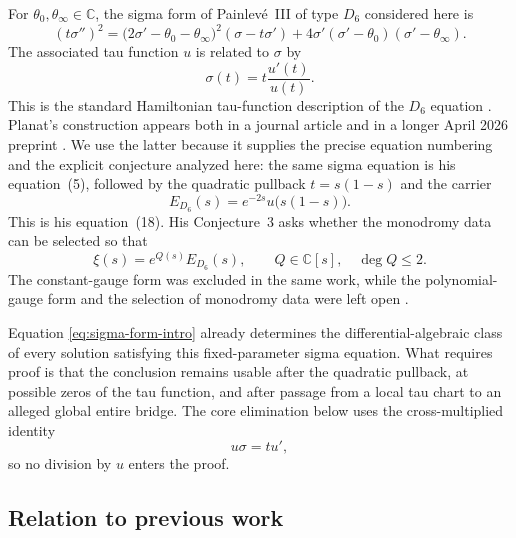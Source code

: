 \documentclass[11pt]{article}
\numberwithin{equation}{section}
\theoremstyle{definition}
\theoremstyle{remark}
\newcommand{\C}{\mathbb C}
\begin{document}
For $\theta_0,\theta_\infty\in\C$, the sigma form of Painlev\'e~III of type $D_6$ considered
here is
\begin{equation}
 (t\sigma'')^2
 =\bigl(2\sigma'-\theta_0-\theta_\infty\bigr)^2
      (\sigma-t\sigma')
   +4\sigma'(\sigma'-\theta_0)(\sigma'-\theta_\infty).
 \label{eq:sigma-form-intro}
\end{equation}
The associated tau function $u$ is related to $\sigma$ by
\begin{equation}
 \sigma(t)=t\frac{u'(t)}{u(t)}.
 \label{eq:tau-sigma-quotient}
\end{equation}
This is the standard Hamiltonian tau-function description of the $D_6$ equation
\cite{JMU1981,Miwa1981,Okamoto1981,Okamoto1987}.  Planat's construction appears both in a journal
article \cite{Planat2026GFJ} and in a longer April 2026 preprint \cite{Planat2026}.  We use the
latter because it supplies the precise equation numbering and the explicit conjecture analyzed
here: the same sigma equation is his equation~(5), followed by the quadratic pullback
$t=s(1-s)$ and the carrier
\begin{equation}
 E_{D_6}(s)=e^{-2s}u\bigl(s(1-s)\bigr).
 \label{eq:planat-carrier}
\end{equation}
This is his equation~(18).  His Conjecture~3 asks whether the monodromy data can be selected so
that
\begin{equation}
 \xi(s)=e^{Q(s)}E_{D_6}(s),
 \qquad Q\in\C[s],\quad \deg Q\leq2.
 \label{eq:planat-bridge}
\end{equation}
The constant-gauge form was excluded in the same work, while the polynomial-gauge form and the
selection of monodromy data were left open \cite[Conjecture~3 and Section~7]{Planat2026}.

Equation \eqref{eq:sigma-form-intro} already determines the differential-algebraic class of every
solution satisfying this fixed-parameter sigma equation.  What requires proof is that the
conclusion remains usable after the quadratic pullback, at possible zeros of the tau function,
and after passage from a local tau chart to an alleged global entire bridge.  The core elimination
below uses the cross-multiplied identity
\begin{equation}
 u\sigma=tu',
 \label{eq:tau-sigma-cross}
\end{equation}
so no division by $u$ enters the proof.

\subsection*{Relation to previous work}
\end{document}
